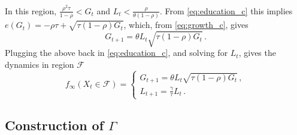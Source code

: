 \documentclass[a4paper,fleqn]{cas-sc}
\begin{document}
In this region, $\frac{\rho^2\tau}{1-\rho} < G_t$ and $L_t<\frac{\rho}{\theta(1-\rho)}$. 
From \eqref{eq:education_c} this implies $e(G_t) = - \rho\tau + \sqrt{\tau(1-\rho)G_t}$, which, from \eqref{eq:growth_c}, gives
%
\begin{equation*}
    G_{t+1} = \theta L_t\sqrt{\tau(1-\rho) G_t}\,.
\end{equation*}
%
Plugging the above back in \eqref{eq:education_c}, and solving for $L_t$, gives the dynamics in region $\mathcal F$
%
\begin{equation}\label{eq:dynamics_in_F}
    f_{\infty}(X_t\in\mathcal F) = \begin{cases}
                            G_{t+1} = \theta L_t\sqrt{\tau(1-\rho)G_t} \,, \\[8pt]
                            L_{t+1} = \frac{\gamma}{\tau} L_t\,.
                      \end{cases}
\end{equation}

\subsection{Construction of $\Gamma$}\label{appenix_C2}
\end{document}
